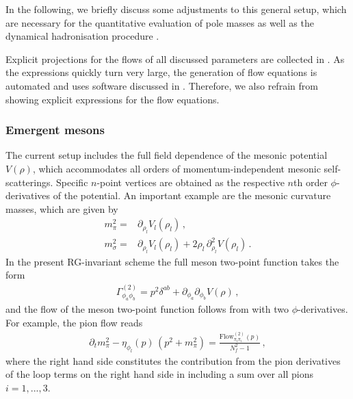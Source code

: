 \documentclass[aps,twocolumn,prd,superscriptaddress]{revtex4-2}
\begin{document}
In the following, we briefly discuss some adjustments to this general setup, which are necessary for the quantitative evaluation of pole masses  as well as the dynamical hadronisation procedure .

Explicit projections for the flows of all discussed parameters are collected in . As the expressions quickly turn very large, the generation of flow equations is automated and uses software discussed in . Therefore, we also refrain from showing explicit expressions for the flow equations. 


\subsubsection{Emergent mesons}
\label{sec:Wavefuncts}

The current setup includes the full field dependence of the mesonic potential $ V( \rho)$, which accommodates all orders of momentum-independent mesonic self-scatterings. Specific $n$-point vertices are obtained as the respective $n$th order $\phi $-derivatives of the potential. An important example are the mesonic curvature masses, which are given by
%
\begin{align}\nonumber 
	m_\pi^2  = &\partial_{\rho_l} V_l( \rho_l) \,,  \\[1ex]
	m_\sigma^2 = &\partial_{ \rho_l} V_l(\rho_l) + 2 \rho_l\,\partial_{ \rho_l}^2 V(\rho_l) \,.
\label{eq:rawMass}
\end{align}
%
In the present RG-invariant scheme the full meson two-point function takes the form 
%
\begin{align}
\Gamma_{\phi_a \phi_b}^{(2)}= p^2 \delta^{ab} + \partial_{\phi_a}\partial_{\phi_b} V(\rho) \,, 
\label{eq:G2phi} 
\end{align}
%
and the flow of the meson two-point function follows from  with two $\phi$-derivatives. For example, the pion flow reads 
%
\begin{align}
	\partial_t m_\pi^2 -\eta_{\phi_l}(p) \,\left( p^2 + m_\pi^2\right) =  \frac{\textrm{Flow}^{(2)}_{\pi_i \pi_i}(p)}{N_f^2-1}  \,, 
	\label{eq:FlowG2pi}
\end{align}
%
where the right hand side constitutes the contribution from the pion derivatives of the loop terms on the right hand side in 
 including a sum over all pions $i=1,...,3$. 
\end{document}
